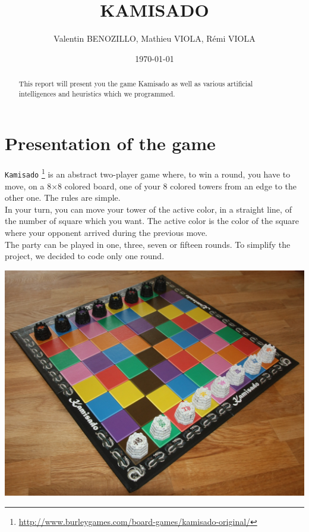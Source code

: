 \documentclass[a4paper, 11pt]{article}
\title{KAMISADO}
\author{Valentin BENOZILLO, Mathieu VIOLA, Rémi VIOLA}
\date{\today}
\begin{document}
\maketitle

\begin{abstract}
This report will present you the game Kamisado as well as various artificial intelligences and heuristics which we programmed.
\end{abstract}

\newpage

\tableofcontents

\newpage

\section{Presentation of the game}
\verb?Kamisado? \footnote{\url{http://www.burleygames.com/board-games/kamisado-original/}} is an abstract two-player game where, to win a round, you have to move, on a 8$\times$8 colored board, one of your 8 colored towers from an edge to the other one. The rules are simple.\\
In your turn, you can move your tower of the active color, in a straight line, of the number of square which you want. The active color is the color of the square where your opponent arrived during the previous move.\\
The party can be played in one, three, seven or fifteen rounds. To simplify the project, we decided to code only one round.
\begin{center}
\includegraphics[scale = 0.09]{kamisado.jpeg}
\end{center}
\end{document}
